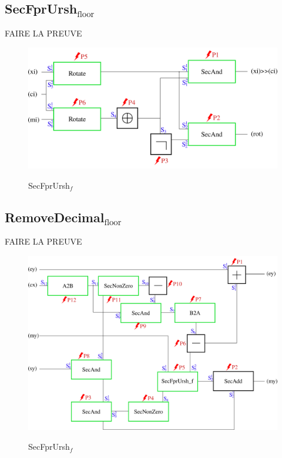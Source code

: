 \documentclass[runningheads]{llncs}
\begin{document}
\subsection{SecFprUrsh$_\text{floor}$}

FAIRE LA PREUVE

\begin{figure}[h!]
  \centering
  \includegraphics[width=1\textwidth]{figure/secfprurshmod.pdf}
  \label{fig:Secfprursh}
  \caption{SecFprUrsh$_f$}
\end{figure}

\subsection{RemoveDecimal$_\text{floor}$}

FAIRE LA PREUVE

\begin{figure}[h!]
  \centering
  \includegraphics[width=1\textwidth]{figure/RemoveDec.pdf}
  \label{fig:Secfprursh}
  \caption{SecFprUrsh$_f$}
\end{figure}
\end{document}
